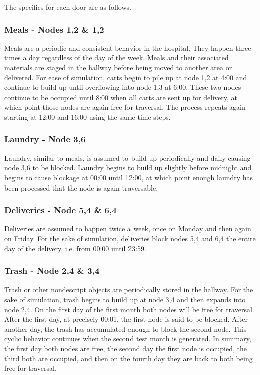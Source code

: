  The specifics for each door are as follows.

  \subsubsection{ Meals - Nodes 1,2 \& 1,2}

  Meals are a periodic and consistent behavior in the hospital. They happen
  three times a day regardless of the day of the week. Meals and their
  associated materials are staged in the hallway before being moved to
  another area or delivered. For ease of simulation, carts begin to pile up
  at node 1,2 at 4:00 and continue to build up until overflowing into node 1,3
  at 6:00. These two nodes continue to be occupied until 8:00 when all carts
  are sent up for delivery, at which point those nodes are again free for traversal. The
  process repeats again starting at 12:00 and 16:00 using the same time steps.

  \subsubsection{ Laundry - Node 3,6 }

  Laundry, similar to meals, is assumed to build up periodically and daily
  causing node 3,6 to be blocked. Laundry begins to build up slightly
  before midnight and begins to cause blockage at 00:00 until 12:00, at which
  point enough laundry has been processed that the node is again traversable.

  \subsubsection{ Deliveries - Node 5,4 \& 6,4 }

  Deliveries are assumed to happen twice a week, once on Monday and then again
  on Friday. For the sake of simulation, deliveries block nodes 5,4 and 6,4
  the entire day of the delivery, i.e. from 00:00 until 23:59.

  \subsubsection{ Trash - Node 2,4 \& 3,4 }

  Trash or other nondescript objects are periodically stored in the hallway.
  For the sake of simulation, trash begins to build up at node 3,4
  and then expands into node 2,4. On the first day of the first month both nodes
  will be free for traversal. After the first day, at precisely 00:01, the first
  node is said to be blocked. After another day, the trash has accumulated
  enough to block the second node. This cyclic behavior continues
  when the second test month is generated. In summary, the first day both nodes
  are free, the second day the first node is occupied, the third both are
  occupied, and then on the fourth day they are back to both being free for
  traversal.

